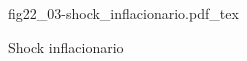 \begin{figure}[h]
\centering
\def\svgwidth{0.5\textwidth}
{fig22_03-shock_inflacionario.pdf_tex}
\caption{Shock inflacionario}
\label{fig22_03-shock_inflacionario}
\end{figure}